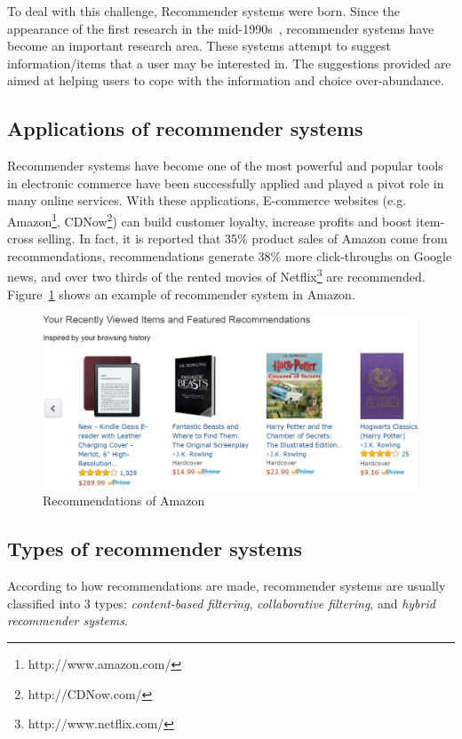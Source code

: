 \documentclass[oneside,13pt]{extreport}
\begin{document}
To deal with this challenge, Recommender systems were born. Since the appearance of the first research in the mid-1990s~\cite{Hill, Resnick, Shardanand}, recommender systems have become an important research area. These systems attempt to suggest information/items that a user may be interested in. The suggestions provided are aimed at helping users to cope with the information and choice over-abundance. 

\subsection{Applications of recommender systems}
Recommender systems have become one of the most powerful and popular tools in electronic commerce have been successfully applied and played a pivot role in many online services. With these applications, E-commerce websites (e.g. Amazon\footnote{http://www.amazon.com/}, CDNow\footnote{http://CDNow.com/}) can build customer loyalty, increase profits and boost item-cross selling. In fact, it is reported that 35\% product sales of Amazon come from recommendations, recommendations generate 38\% more click-throughs on Google news, and over two thirds of the rented movies of Netflix\footnote{http://www.netflix.com/} are recommended\cite{Chevalier}.
Figure~\ref{fig:amazon} shows an example of recommender system in Amazon.
\begin{figure}[h!]
    \centering
    \includegraphics[width=\textwidth]{amazon.png} 
    \caption{Recommendations of Amazon}
    \label{fig:amazon}
\end{figure}

\subsection{Types of recommender systems}
According to how recommendations are made, recommender systems are usually classified into 3 types\cite{Adomavicius, Balabanovic}: \emph{content-based filtering}, \emph{collaborative filtering}, and \emph{hybrid recommender systems}.
\end{document}
